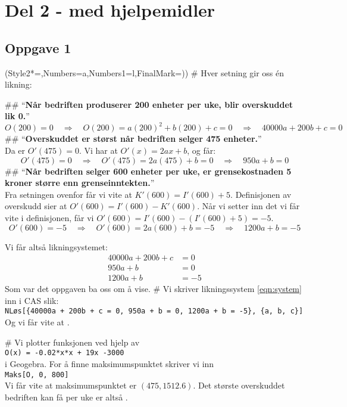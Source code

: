 	
\pagebreak
\section*{Del 2 - med hjelpemidler}

\subsection*{Oppgave 1}
\begin{easylist}[enumerate]
	\ListProperties(Style2*=,Numbers=a,Numbers1=l,FinalMark={)})
	# Hver setning gir oss én likning:
	\begin{easylist}[itemize]
		## ``\textbf{Når bedriften produserer 200 enheter per uke, blir overskuddet lik 0.}'' \\
		\begin{equation*}
			O(200) = 0 \quad \Rightarrow \quad O(200) = a (200)^2 + b(200) + c = 0 \quad \Rightarrow \quad 40000a + 200b + c = 0
		\end{equation*}
		## ``\textbf{Overskuddet er størst når bedriften selger 475 enheter.}''\\
		Da er $O'(475) = 0$. Vi har at $O'(x) = 2ax + b$, og får:
		\begin{equation*}
		O'(475) = 0 \quad \Rightarrow \quad O'(475) = 2a (475) + b = 0 \quad \Rightarrow \quad 950a + b = 0
		\end{equation*}
		## ``\textbf{Når bedriften selger 600 enheter per uke, er grensekostnaden 5 kroner større enn grenseinntekten.}'' \\
		Fra setningen ovenfor får vi vite at $K'(600) = I'(600) + 5$. Definisjonen av overskudd sier at $O'(600) = I'(600) - K'(600)$. Når vi setter inn det vi får vite i definisjonen, får vi
		$O'(600) = I'(600) - \left(I'(600) + 5\right) = -5$.
		\begin{equation*}
		O'(600) = -5 \quad \Rightarrow \quad O'(600) = 2a (600) + b = -5 \quad \Rightarrow \quad 1200a + b = -5
		\end{equation*}
	\end{easylist}
	Vi får altså likningsystemet:
	\begin{align}
		\nonumber 40000a + 200b + c &= 0 \\
		\label{eqn:system}950 a + b &= 0 \\
	\nonumber	1200a + b &= -5
	\end{align}
	Som var det oppgaven ba oss om å vise.
	# Vi skriver likningssystem \eqref{eqn:system} inn i CAS slik: \\
	\verb|NLøs[{40000a + 200b + c = 0, 950a + b = 0, 1200a + b = -5}, {a, b, c}]|
	Og vi får vite at .
	
	# Vi plotter funksjonen ved hjelp av \\
	\verb|O(x) = -0.02*x*x + 19x -3000| \\
	i Geogebra. For å finne maksimumspunktet skriver vi inn \\
	\verb|Maks[O, 0, 800]| \\
	Vi får vite at maksimumspunktet er $(475, 1512.6)$.
	Det største overskuddet bedriften kan få per uke er altså .
\end{easylist}



